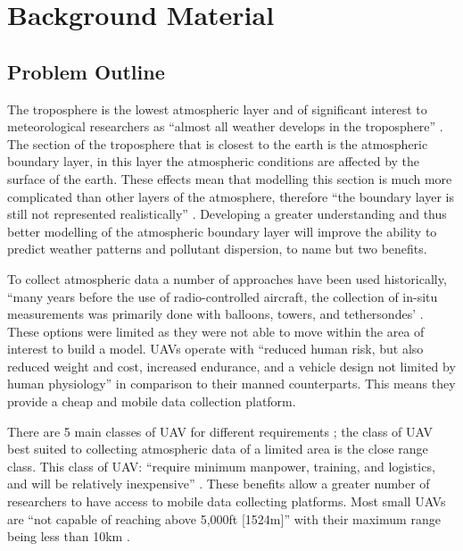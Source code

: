 \documentclass[a4paper,12pt,twoside]{article}
\begin{document}
\section{Background Material}
\label{sec:background_material}

\subsection{Problem Outline}
\label{sec:problem_outline}

The troposphere is the lowest atmospheric layer and of significant interest to meteorological researchers as ``almost all weather develops in the troposphere'' \cite{NatGeo}. The section of the troposphere that is closest to the earth is the atmospheric boundary layer, in this layer the atmospheric conditions are affected by the surface of the earth. These effects mean that modelling this section is much more complicated than other layers of the atmosphere, therefore ``the boundary layer is still not represented realistically'' \cite{Teixeira2008}. Developing a greater understanding and thus better modelling of the atmospheric boundary layer will improve the ability to predict weather patterns and pollutant dispersion, to name but two benefits.

To collect atmospheric data a number of approaches have been used historically, ``many years before the use of radio-controlled aircraft, the collection of in-situ measurements was primarily done with balloons, towers, and tethersondes' \cite{Bonin2011}. These options were limited as they were not able to move within the area of interest to build a model. UAVs operate with ``reduced human risk, but also reduced weight and cost, increased endurance, and a vehicle design not limited by human physiology'' \cite{Pepper2012} in comparison to their manned counterparts. This means they provide a cheap and mobile data collection platform.

There are 5 main classes of UAV for different requirements \cite{Sarris2001}; the class of UAV best suited to collecting atmospheric data of a limited area is the close range class. This class of UAV: ``require minimum manpower, training, and logistics, and will be relatively inexpensive'' \cite{FasDod}. These benefits allow a greater number of researchers to have access to mobile data collecting platforms. Most small UAVs are ``not capable of reaching above 5,000ft [1524m]'' \cite{Weibel2005} with their maximum range being less than 10km \cite{Blyenburgh2000}.
\end{document}
